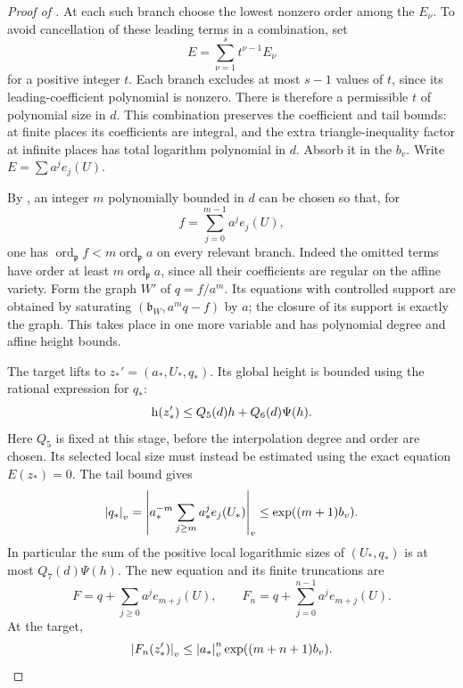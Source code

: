 \begin{proof}[Proof of ]
At each such branch choose the lowest nonzero order among the $E_\nu$.
To avoid cancellation of these leading terms in a combination, set
\[
 E=\sum_{\nu=1}^s t^{\nu-1}E_\nu
\]
for a positive integer $t$.  Each branch excludes at most $s-1$ values
of $t$, since its leading-coefficient polynomial is nonzero.  There is
therefore a permissible $t$ of polynomial size in $d$.  This combination preserves
the coefficient and tail bounds: at finite places its coefficients
are integral, and the extra triangle-inequality factor at infinite
places has total logarithm polynomial in $d$.  Absorb it in the $b_v$.
Write $E=\sum a^j e_j(U)$.

By , an integer $m$ polynomially bounded in
$d$ can be chosen so that, for
\[
 f=\sum_{j=0}^{m-1}a^je_j(U),
\]
one has $\operatorname{ord}_{\mathfrak p}f
<m\operatorname{ord}_{\mathfrak p}a$ on every relevant branch.
Indeed the omitted terms have order at least
$m\operatorname{ord}_{\mathfrak p}a$, since all their coefficients
are regular on the affine variety.  Form the graph $W'$ of
$q=f/a^m$.  Its equations with controlled support are obtained by
saturating $(\mathfrak b_W,a^mq-f)$ by $a$; the closure of its support
is exactly the graph.  This takes place in one more variable and
has polynomial degree and affine height bounds.

The target lifts to $z_*'=(a_*,U_*,q_*)$.  Its global height is bounded
using the rational expression for $q_*$:
\begin{equation}\label{eq:graph-global-height}
 \mathrm h\!\left(z_*'\right)\leq Q_5(d)h+Q_6(d)\Psi(h).
\end{equation}
Here $Q_5$ is fixed at this stage, before the interpolation degree and
order are chosen.  Its selected local size must instead be estimated
using the exact equation $E(z_*)=0$.  The tail bound gives
\begin{equation}\label{eq:graph-local-height}
 \left\lvert q_*\right\rvert_v
 =\left|a_*^{-m}\sum_{j\geq m}a_*^je_j(U_*)\right|_v
 \leq\exp((m+1)b_v).
\end{equation}
In particular the sum of the positive local logarithmic sizes of
$(U_*,q_*)$ is at most $Q_7(d)\Psi(h)$.
The new equation and its finite truncations are
\[
 F=q+\sum_{j\geq0}a^je_{m+j}(U),\qquad
 F_n=q+\sum_{j=0}^{n-1}a^je_{m+j}(U).
\]
At the target,
\begin{equation}\label{eq:shifted-tail}
 \left\lvert F_n(z_*')\right\rvert_v
 \leq\left\lvert a_*\right\rvert_v^n\exp((m+n+1)b_v).
\end{equation}


\end{proof}
